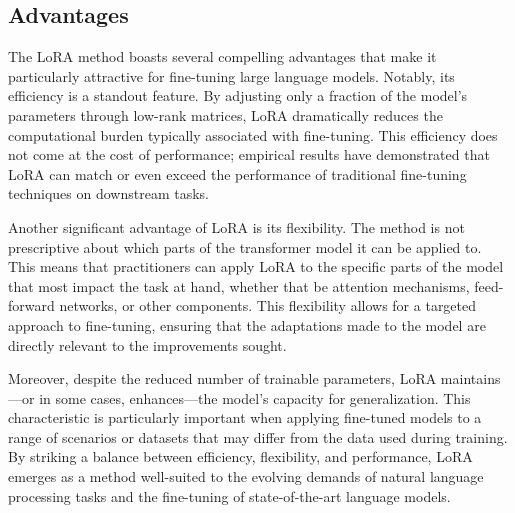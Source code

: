 \subsection{Advantages}
The LoRA method boasts several compelling advantages that make it particularly attractive for fine-tuning large language models. Notably, its efficiency is a standout feature. By adjusting only a fraction of the model's parameters through low-rank matrices, LoRA dramatically reduces the computational burden typically associated with fine-tuning. This efficiency does not come at the cost of performance; empirical results have demonstrated that LoRA can match or even exceed the performance of traditional fine-tuning techniques on downstream tasks.

Another significant advantage of LoRA is its flexibility. The method is not prescriptive about which parts of the transformer model it can be applied to. This means that practitioners can apply LoRA to the specific parts of the model that most impact the task at hand, whether that be attention mechanisms, feed-forward networks, or other components. This flexibility allows for a targeted approach to fine-tuning, ensuring that the adaptations made to the model are directly relevant to the improvements sought.

Moreover, despite the reduced number of trainable parameters, LoRA maintains—or in some cases, enhances—the model's capacity for generalization. This characteristic is particularly important when applying fine-tuned models to a range of scenarios or datasets that may differ from the data used during training. By striking a balance between efficiency, flexibility, and performance, LoRA emerges as a method well-suited to the evolving demands of natural language processing tasks and the fine-tuning of state-of-the-art language models.


